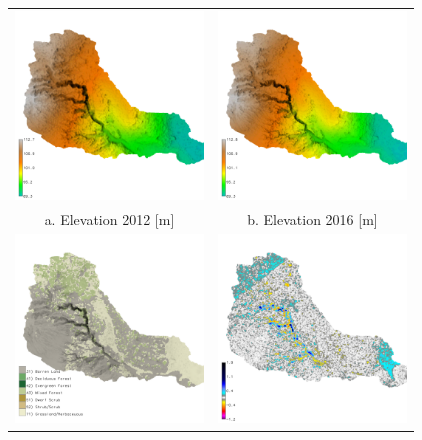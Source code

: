 \documentclass{standalone}
\begin{document}
\scriptsize
\centering 

\begin{tabular}{m{} m{}}
%
\multicolumn{1}{c}{\includegraphics[height=50mm]{../../images/sample_data/elevation_2012.png}} &
\multicolumn{1}{c}{\includegraphics[height=50mm]{../../images/sample_data/elevation_2016.png}}\\
\multicolumn{1}{c}{a. Elevation 2012 [m]} & \multicolumn{1}{c}{b. Elevation 2016 [m]}\\
%
\multicolumn{1}{c}{\includegraphics[height=50mm]{../../images/sample_data/landcover.png}} &
\multicolumn{1}{c}{\includegraphics[height=50mm]{../../images/sample_data/difference_2012_2016.png}}\\

\end{tabular}
\end{document}
